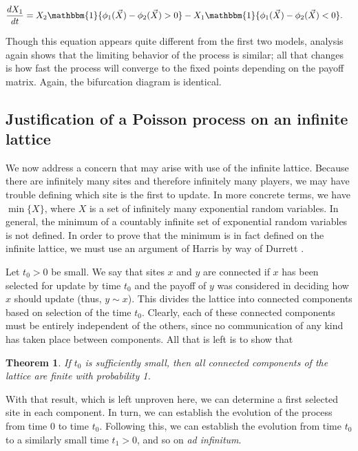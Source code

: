 \documentclass[notitlepage,reqno]{amsart}
\newtheorem{thm}{Theorem}
\begin{document}
\begin{align*}
    \frac{d X_1}{dt} &=
    X_2\mathbbm{1}\{\phi_1(\vec{X})-\phi_2(\vec{X}) > 0\} -
    X_1\mathbbm{1}\{\phi_1(\vec{X})-\phi_2(\vec{X}) < 0\}.
\end{align*}

Though this equation appears quite different from the first two
models, analysis again shows that the limiting behavior of the
process is similar; all that changes is how fast the process will
converge to the fixed points depending on the payoff matrix. Again, the bifurcation diagram is identical.

\subsection{Justification of a Poisson process on an infinite lattice}

We now address a concern that may arise with use of the infinite
lattice. Because there are infinitely many sites and therefore
infinitely many players, we may have trouble defining which site is
the first to update. In more concrete terms, we have $\min\{X\}$,
where $X$ is a set of infinitely many exponential random variables. In
general, the minimum of a countably infinite set of exponential random
variables is not defined. In order to prove that the minimum is in
fact defined on the infinite lattice, we must use an argument of
Harris by way of Durrett \cite{harris}\cite{durrett}.

Let $t_0 > 0$ be small. We say that sites $x$ and $y$ are connected if
$x$ has been selected for update by time $t_0$ and the payoff of $y$
was considered in deciding how $x$ should update (thus, $y\sim
x$). This divides the lattice into connected components based on
selection of the time $t_0$. Clearly, each of these connected
components must be entirely independent of the others, since no
communication of any kind has taken place between
components. All that is left is to show that

\begin{thm}
  If $t_0$ is sufficiently small, then all connected components of the
  lattice are finite with probability 1.
\end{thm}

With that result, which is left unproven here, we can determine a
first selected site in each component. In turn, we can establish the
evolution of the process from time 0 to time $t_0$. Following
this, we can establish the evolution from time $t_0$ to a similarly
small time $t_1 > 0$, and so on \textit{ad infinitum}.
\end{document}
